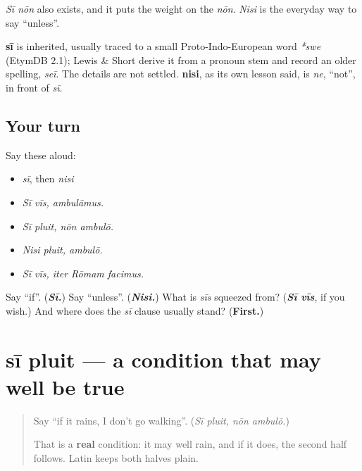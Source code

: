 \emph{Sī nōn} also exists, and it puts the weight on the \emph{nōn}. \emph{Nisi} is the everyday way to say \textquotedblleft{}unless\textquotedblright{}.

\begin{cousinweb}
\textbf{sī} is inherited, usually traced to a small Proto-Indo-European word \emph{*swe} (EtymDB 2.1); Lewis \& Short derive it from a pronoun stem and record an older spelling, \emph{seī}. The details are not settled. \textbf{nisi}, as its own lesson said, is \emph{ne}, \textquotedblleft{}not\textquotedblright{}, in front of \emph{sī}.
\end{cousinweb}

\subsection*{Your turn}
Say these aloud:

\begin{itemize}
\raggedright
  \item \emph{sī}, then \emph{nisi}
  \item \emph{Sī vīs, ambulāmus.}
  \item \emph{Sī pluit, nōn ambulō.}
  \item \emph{Nisi pluit, ambulō.}
  \item \emph{Sī vīs, iter Rōmam facimus.}
\end{itemize}

\begin{tcolorbox}[breakable,colback=teal!4,colframe=teal!35!black,title={Before you move on}]
Say \textquotedblleft{}if\textquotedblright{}. (\emph{\textbf{Sī.}}) Say \textquotedblleft{}unless\textquotedblright{}. (\emph{\textbf{Nisi.}}) What is \emph{sīs} squeezed from? (\emph{\textbf{Sī vīs}}, if you wish.) And where does the \emph{sī} clause usually stand? (\textbf{First.})
\end{tcolorbox}
\section[sī pluit, in vīllā manēmus]{sī pluit — a condition that may well be true}

\label{lesson:LA-C289-si-pluit}



\begin{quote}
Say \textquotedblleft{}if it rains, I don't go walking\textquotedblright{}. (\emph{Sī pluit, nōn ambulō.})

That is a \textbf{real} condition: it may well rain, and if it does, the second half follows. Latin keeps both halves plain.
\end{quote}

